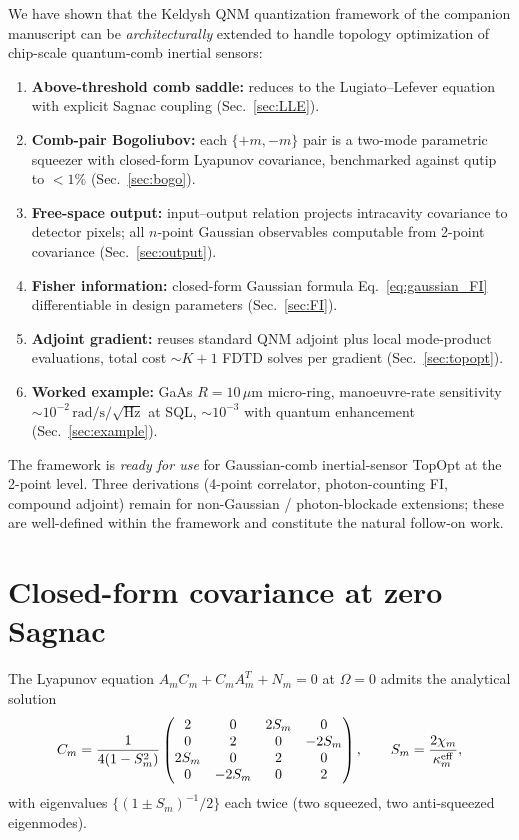 \documentclass[11pt]{article}
\newcommand{\eff}{{\rm eff}}
\begin{document}
We have shown that the Keldysh QNM quantization framework of the
companion manuscript can be \emph{architecturally} extended to handle
topology optimization of chip-scale quantum-comb inertial sensors:
\begin{enumerate}\itemsep0em
\item \textbf{Above-threshold comb saddle:} reduces to the
  Lugiato--Lefever equation with explicit Sagnac coupling
  (Sec.~\ref{sec:LLE}).
\item \textbf{Comb-pair Bogoliubov:} each $\{+m,-m\}$ pair is a
  two-mode parametric squeezer with closed-form Lyapunov covariance,
  benchmarked against qutip to $<1\%$
  (Sec.~\ref{sec:bogo}).
\item \textbf{Free-space output:} input--output relation projects
  intracavity covariance to detector pixels; all
  $n$-point Gaussian observables computable from 2-point
  covariance (Sec.~\ref{sec:output}).
\item \textbf{Fisher information:} closed-form Gaussian formula
  Eq.~\eqref{eq:gaussian_FI} differentiable in design parameters
  (Sec.~\ref{sec:FI}).
\item \textbf{Adjoint gradient:} reuses standard QNM adjoint plus
  local mode-product evaluations, total cost
  $\sim K+1$ FDTD solves per gradient (Sec.~\ref{sec:topopt}).
\item \textbf{Worked example:} GaAs $R=10\,\mu\mathrm{m}$
  micro-ring, manoeuvre-rate sensitivity
  $\sim 10^{-2}\,\mathrm{rad/s}/\sqrt{\mathrm{Hz}}$ at SQL,
  $\sim 10^{-3}$ with quantum enhancement
  (Sec.~\ref{sec:example}).
\end{enumerate}

The framework is \emph{ready for use} for Gaussian-comb inertial-sensor
TopOpt at the 2-point level.  Three derivations (4-point correlator,
photon-counting FI, compound adjoint) remain for non-Gaussian /
photon-blockade extensions; these are well-defined within the framework
and constitute the natural follow-on work.

\appendix
\section{Closed-form covariance at zero Sagnac}
\label{app:cov_closed}

The Lyapunov equation $A_m C_m + C_m A_m^T + N_m = 0$ at $\Omega=0$
admits the analytical solution
\begin{equation}
  C_m = \frac{1}{4(1-S_m^2)}
  \begin{pmatrix}
    2 & 0 & 2 S_m & 0 \\
    0 & 2 & 0 & -2 S_m \\
    2 S_m & 0 & 2 & 0 \\
    0 & -2 S_m & 0 & 2
  \end{pmatrix},
  \qquad S_m = \frac{2\chi_m}{\kappa_m^\eff},
\end{equation}
with eigenvalues $\{(1\pm S_m)^{-1}/2\}$ each twice (two squeezed,
two anti-squeezed eigenmodes).
\end{document}
